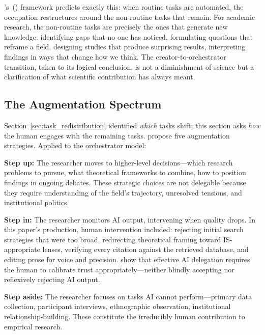 \documentclass{article}
\begin{document}
\citeauthor{autor2015why}'s~(\citeyear{autor2015why}) framework predicts exactly this: when routine tasks are automated, the occupation restructures around the non-routine tasks that remain. For academic research, the non-routine tasks are precisely the ones that generate new knowledge: identifying gaps that no one has noticed, formulating questions that reframe a field, designing studies that produce surprising results, interpreting findings in ways that change how we think. The creator-to-orchestrator transition, taken to its logical conclusion, is not a diminishment of science but a clarification of what scientific contribution has always meant.

\subsection{The Augmentation Spectrum}

Section~\ref{sec:task_redistribution} identified \textit{which} tasks shift; this section asks \textit{how} the human engages with the remaining tasks. \citet{davenport2016just} propose five augmentation strategies. Applied to the orchestrator model:

\textbf{Step up:} The researcher moves to higher-level decisions---which research problems to pursue, what theoretical frameworks to combine, how to position findings in ongoing debates. These strategic choices are not delegable because they require understanding of the field's trajectory, unresolved tensions, and institutional politics.

\textbf{Step in:} The researcher monitors AI output, intervening when quality drops. In this paper's production, human intervention included: rejecting initial search strategies that were too broad, redirecting theoretical framing toward IS-appropriate lenses, verifying every citation against the retrieved database, and editing prose for voice and precision. \citet{hemmer2023delegation} show that effective AI delegation requires the human to calibrate trust appropriately---neither blindly accepting nor reflexively rejecting AI output.

\textbf{Step aside:} The researcher focuses on tasks AI cannot perform---primary data collection, participant interviews, ethnographic observation, institutional relationship-building. These constitute the irreducibly human contribution to empirical research.
\end{document}

